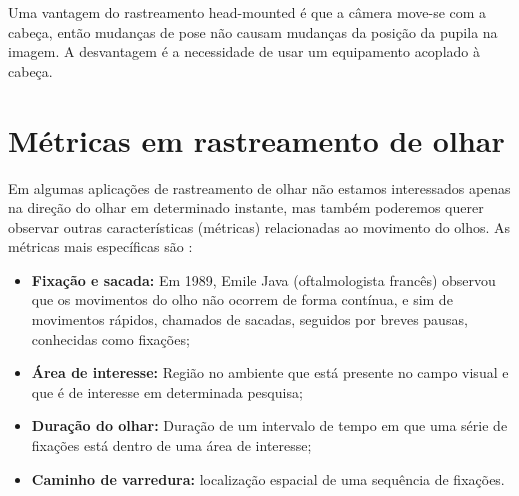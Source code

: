 Uma vantagem do rastreamento head-mounted é que a câmera move-se com a cabeça, então mudanças de pose não causam mudanças da posição da pupila na imagem. A desvantagem é a necessidade de usar um equipamento acoplado à cabeça.

\section{Métricas em rastreamento de olhar}

Em algumas aplicações de rastreamento de olhar não estamos interessados apenas na direção do olhar em determinado instante, mas também poderemos querer observar outras características (métricas) relacionadas ao movimento do olhos. As métricas mais específicas são \cite{lupung}:

\begin{itemize}
\item {\bf Fixação e sacada:} Em 1989, Emile Java (oftalmologista francês) observou que os movimentos do olho não ocorrem de forma contínua, e sim de movimentos rápidos, chamados de sacadas, seguidos por breves pausas, conhecidas como fixações;

\item {\bf Área de interesse:} Região no ambiente que está presente no campo visual e que é de interesse em determinada pesquisa;

\item {\bf Duração do olhar:} Duração de um intervalo de tempo em que uma série de fixações está dentro de uma área de interesse;

\item {\bf Caminho de varredura:} localização espacial de uma sequência de fixações.
\end{itemize}